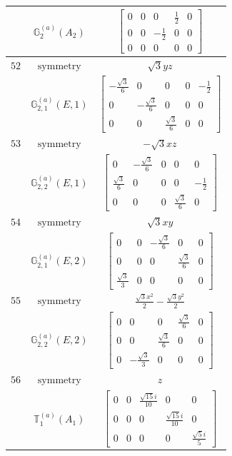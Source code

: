 \documentclass[fleqn,8pt,landscape]{jsarticle}
\begin{document}
\begin{longtable}{ccc}
$  $ & $ \mathbb{G}_{2}^{(a)}(A_{2}) $ & $ \begin{bmatrix} 0 & 0 & 0 & \frac{1}{2} & 0 \\ 0 & 0 & - \frac{1}{2} & 0 & 0 \\ 0 & 0 & 0 & 0 & 0 \end{bmatrix} $ \\ \hline
$ 52 $ & $ \text{symmetry} $ & $ \sqrt{3} y z $ \\
$  $ & $ \mathbb{G}_{2,1}^{(a)}(E,1) $ & $ \begin{bmatrix} - \frac{\sqrt{3}}{6} & 0 & 0 & 0 & - \frac{1}{2} \\ 0 & - \frac{\sqrt{3}}{6} & 0 & 0 & 0 \\ 0 & 0 & \frac{\sqrt{3}}{6} & 0 & 0 \end{bmatrix} $ \\ \hline
$ 53 $ & $ \text{symmetry} $ & $ - \sqrt{3} x z $ \\
$  $ & $ \mathbb{G}_{2,2}^{(a)}(E,1) $ & $ \begin{bmatrix} 0 & - \frac{\sqrt{3}}{6} & 0 & 0 & 0 \\ \frac{\sqrt{3}}{6} & 0 & 0 & 0 & - \frac{1}{2} \\ 0 & 0 & 0 & \frac{\sqrt{3}}{6} & 0 \end{bmatrix} $ \\ \hline
$ 54 $ & $ \text{symmetry} $ & $ \sqrt{3} x y $ \\
$  $ & $ \mathbb{G}_{2,1}^{(a)}(E,2) $ & $ \begin{bmatrix} 0 & 0 & - \frac{\sqrt{3}}{6} & 0 & 0 \\ 0 & 0 & 0 & \frac{\sqrt{3}}{6} & 0 \\ \frac{\sqrt{3}}{3} & 0 & 0 & 0 & 0 \end{bmatrix} $ \\ \hline
$ 55 $ & $ \text{symmetry} $ & $ \frac{\sqrt{3} x^{2}}{2} - \frac{\sqrt{3} y^{2}}{2} $ \\
$  $ & $ \mathbb{G}_{2,2}^{(a)}(E,2) $ & $ \begin{bmatrix} 0 & 0 & 0 & \frac{\sqrt{3}}{6} & 0 \\ 0 & 0 & \frac{\sqrt{3}}{6} & 0 & 0 \\ 0 & - \frac{\sqrt{3}}{3} & 0 & 0 & 0 \end{bmatrix} $ \\ \hline
$ 56 $ & $ \text{symmetry} $ & $ z $ \\
$  $ & $ \mathbb{T}_{1}^{(a)}(A_{1}) $ & $ \begin{bmatrix} 0 & 0 & \frac{\sqrt{15} i}{10} & 0 & 0 \\ 0 & 0 & 0 & \frac{\sqrt{15} i}{10} & 0 \\ 0 & 0 & 0 & 0 & \frac{\sqrt{5} i}{5} \end{bmatrix} $ \\ \hline

\end{longtable}
\end{document}
